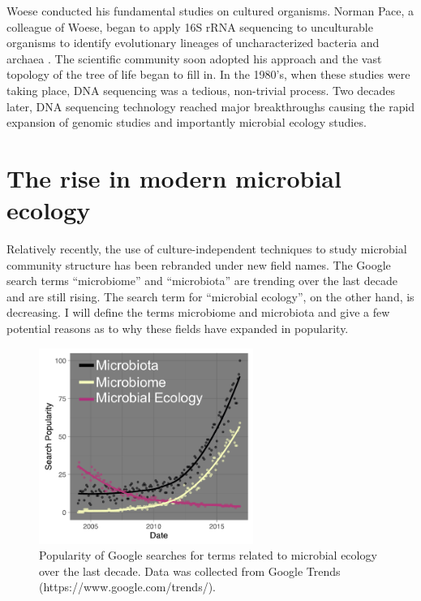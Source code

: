 Woese conducted his fundamental studies on cultured organisms. Norman Pace, a colleague of Woese, began to apply 16S rRNA sequencing to unculturable organisms to identify evolutionary lineages of uncharacterized bacteria and archaea \cite{Pace1986}. The scientific community soon adopted his approach and the vast topology of the tree of life began to fill in. In the 1980's, when these studies were taking place, DNA sequencing was a tedious, non-trivial process. Two decades later, DNA sequencing technology reached major breakthroughs causing the rapid expansion of genomic studies and importantly microbial ecology studies.

\section{The rise in modern microbial ecology}
%
Relatively recently, the use of culture-independent techniques to study microbial community structure has been rebranded under new field names. The Google search terms ``microbiome'' and ``microbiota'' are trending over the last decade and are still rising. The search term for ``microbial ecology'', on the other hand, is decreasing. I will define the terms microbiome and microbiota and give a few potential reasons as to why these fields have expanded in popularity.

\begin{figure}[tbh]
\centering
\includegraphics[width=2.75in]{Figures/intro_fig1}
\caption[Figure 1.1]{Popularity of Google searches for terms related to microbial ecology over the last decade. Data was collected from Google Trends (https://www.google.com/trends/).}
\label{Figure 1.1}
\end{figure}

